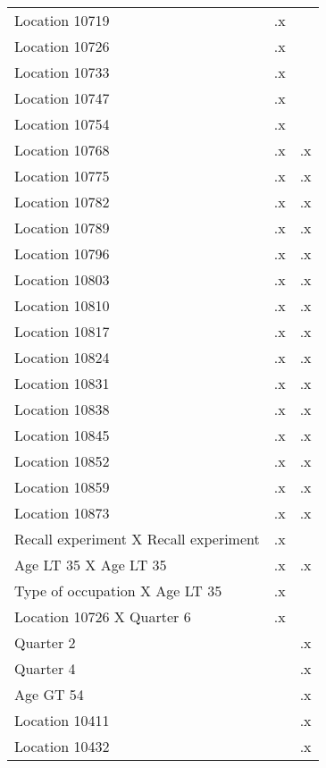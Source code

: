 \begin{tabular}{l*{2}{c}}
Location 10719      &          .x&            \\
Location 10726      &          .x&            \\
Location 10733      &          .x&            \\
Location 10747      &          .x&            \\
Location 10754      &          .x&            \\
Location 10768      &          .x&          .x\\
Location 10775      &          .x&          .x\\
Location 10782      &          .x&          .x\\
Location 10789      &          .x&          .x\\
Location 10796      &          .x&          .x\\
Location 10803      &          .x&          .x\\
Location 10810      &          .x&          .x\\
Location 10817      &          .x&          .x\\
Location 10824      &          .x&          .x\\
Location 10831      &          .x&          .x\\
Location 10838      &          .x&          .x\\
Location 10845      &          .x&          .x\\
Location 10852      &          .x&          .x\\
Location 10859      &          .x&          .x\\
Location 10873      &          .x&          .x\\
Recall experiment X Recall experiment&          .x&            \\
Age LT 35 X Age LT 35&          .x&          .x\\
Type of occupation X Age LT 35&          .x&            \\
Location 10726 X Quarter 6&          .x&            \\
Quarter 2           &            &          .x\\
Quarter 4           &            &          .x\\
Age GT 54           &            &          .x\\
Location 10411      &            &          .x\\
Location 10432      &            &          .x\\

\end{tabular}
